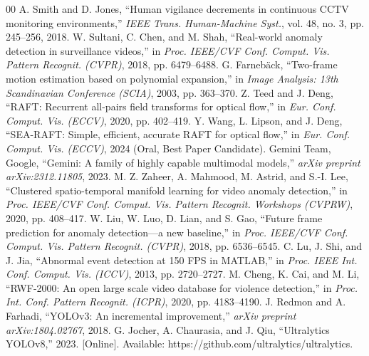 \documentclass[conference]{IEEEtran}
\begin{document}

\begin{thebibliography}{00}
 A. Smith and D. Jones, ``Human vigilance decrements in continuous CCTV monitoring environments,'' \textit{IEEE Trans. Human-Machine Syst.}, vol. 48, no. 3, pp. 245--256, 2018.
 W. Sultani, C. Chen, and M. Shah, ``Real-world anomaly detection in surveillance videos,'' in \textit{Proc. IEEE/CVF Conf. Comput. Vis. Pattern Recognit. (CVPR)}, 2018, pp. 6479--6488.
 G. Farneb\"ack, ``Two-frame motion estimation based on polynomial expansion,'' in \textit{Image Analysis: 13th Scandinavian Conference (SCIA)}, 2003, pp. 363--370.
 Z. Teed and J. Deng, ``RAFT: Recurrent all-pairs field transforms for optical flow,'' in \textit{Eur. Conf. Comput. Vis. (ECCV)}, 2020, pp. 402--419.
 Y. Wang, L. Lipson, and J. Deng, ``SEA-RAFT: Simple, efficient, accurate RAFT for optical flow,'' in \textit{Eur. Conf. Comput. Vis. (ECCV)}, 2024 (Oral, Best Paper Candidate).
 Gemini Team, Google, ``Gemini: A family of highly capable multimodal models,'' \textit{arXiv preprint arXiv:2312.11805}, 2023.
 M. Z. Zaheer, A. Mahmood, M. Astrid, and S.-I. Lee, ``Clustered spatio-temporal manifold learning for video anomaly detection,'' in \textit{Proc. IEEE/CVF Conf. Comput. Vis. Pattern Recognit. Workshops (CVPRW)}, 2020, pp. 408--417.
 W. Liu, W. Luo, D. Lian, and S. Gao, ``Future frame prediction for anomaly detection---a new baseline,'' in \textit{Proc. IEEE/CVF Conf. Comput. Vis. Pattern Recognit. (CVPR)}, 2018, pp. 6536--6545.
 C. Lu, J. Shi, and J. Jia, ``Abnormal event detection at 150 FPS in MATLAB,'' in \textit{Proc. IEEE Int. Conf. Comput. Vis. (ICCV)}, 2013, pp. 2720--2727.
 M. Cheng, K. Cai, and M. Li, ``RWF-2000: An open large scale video database for violence detection,'' in \textit{Proc. Int. Conf. Pattern Recognit. (ICPR)}, 2020, pp. 4183--4190.
 J. Redmon and A. Farhadi, ``YOLOv3: An incremental improvement,'' \textit{arXiv preprint arXiv:1804.02767}, 2018.
 G. Jocher, A. Chaurasia, and J. Qiu, ``Ultralytics YOLOv8,'' 2023. [Online]. Available: https://github.com/ultralytics/ultralytics.
\end{thebibliography}
\end{document}
